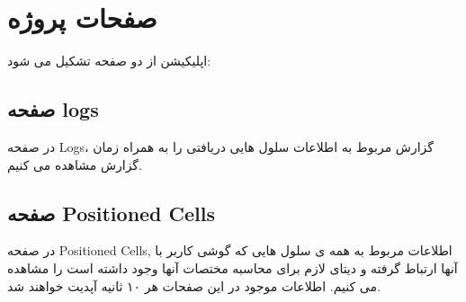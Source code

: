 \documentclass[11pt]{article}
\begin{document}
\section{صفحات پروژه}
اپلیکیشن از دو صفحه تشکیل می شود:
\subsection{صفحه logs}
در صفحه Logs، گزارش مربوط به اطلاعات سلول هایی دریافتی را به همراه زمان گزارش مشاهده می کنیم.
\subsection{صفحه Positioned Cells}
در صفحه Positioned Cells, اطلاعات مربوط به همه ی سلول هایی که گوشی کاربر با آنها ارتباط گرفته و دیتای لازم برای محاسبه مختصات آنها وجود داشته است را مشاهده می کنیم.
اطلاعات موجود در این صفحات هر ۱۰ ثانیه آپدیت خواهند شد.
\end{document}
